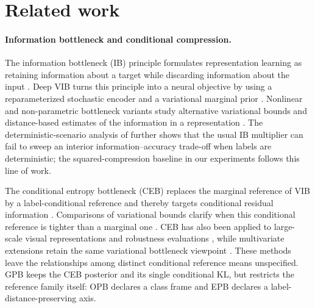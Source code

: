 \section{Related work}
\label{sec:related}

\paragraph{Information bottleneck and conditional compression.}
The information bottleneck (IB) principle formulates representation learning as
retaining information about a target while discarding information about the input
\citep{tishby2000information}. Deep VIB turns this principle into a neural
objective by using a reparameterized stochastic encoder and a variational marginal
prior \citep{alemi2017deep}. Nonlinear and non-parametric bottleneck variants study
alternative variational bounds and distance-based estimates of the information in a
representation \citep{kolchinsky2017nonlinear}. The deterministic-scenario analysis
of \citet{kolchinsky2019caveats} further shows that the usual IB multiplier can fail
to sweep an interior information--accuracy trade-off when labels are deterministic;
the squared-compression baseline in our experiments follows this line of work.

The conditional entropy bottleneck (CEB) replaces the marginal reference of VIB by a
label-conditional reference and thereby targets conditional residual information
\citep{fischer2020conditional}. Comparisons of variational bounds clarify when this
conditional reference is tighter than a marginal one
\citep{geiger2020variational}. CEB has also been applied to large-scale visual
representations and robustness evaluations \citep{fischer2020robustness,lee2021compressive},
while multivariate extensions retain the same variational bottleneck viewpoint
\citep{abdelaleem2025deep}. These methods leave the relationships among distinct
conditional reference means unspecified. GPB keeps the CEB posterior and its single
conditional KL, but restricts the reference family itself: OPB declares a class
frame and EPB declares a label-distance-preserving axis.

